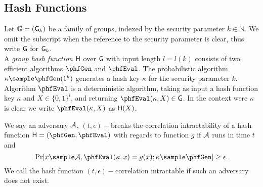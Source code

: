 \begin{figure}[htb!]
    \centering
    \nicoresetlinenr
    \caption{}
    \label{fig:x-soundess}
\end{figure}



\subsection{Hash Functions}

Let $\mathbb{G}= (\mathsf{G}_k)$ be a family of groups, indexed by the security parameter $k \in \mathbb{N}$. We omit the subscript when the reference to the security parameter is clear, thus write $\mathsf{G}$ for $\mathsf{G}_k$.
\\
A \textit{group hash function} $\mathsf{H}$  over $\mathsf{G}$ with input length $l =l(k)$ consists of two efficient algorithms $\phfGen$ and $\phfEval$. The probabilistic algorithm 
$\kappa \sample \phfGen(1^k)$ generates a hash key $\kappa$ for the security parameter $k$. Algorithm 
$\phfEval$ is a deterministic algorithm, taking as input a hash function key $\kappa$ and $X \in \{0,1\}^l$, and returning $\phfEval(\kappa,X) \in \G$. In the context were $\kappa$ is clear we write 
$\phfEval(\kappa,X)$ as $\mathsf{H}(X)$.
\\

\begin{definition}
We say an adversary $\mathcal{A}$, $(t, \epsilon)-$breaks the correlation intractability of a hash function  $\Hash = (\phfGen, \phfEval)$ with regards to function $g$ if $\mathcal{A}$ runs in time $t$ and 
$$\Pr[x \sample \adv, \phfEval(\kappa, x) = g(x); \kappa \sample \phfGen] \geq \epsilon.$$
We call the hash function $(t, \epsilon)-$correlation intractable if such an adversary does not exist.
\end{definition}


